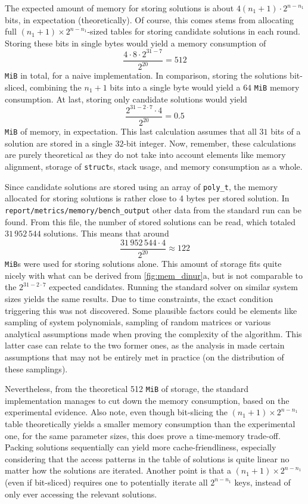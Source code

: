 The expected amount of memory for storing solutions is about $4(n_1 + 1) \cdot 2^{n - n_1}$ bits, in expectation (theoretically). Of course, this comes stems from allocating full $(n_1 + 1) \times 2^{n - n_1}$-sized tables for storing candidate solutions in each round. Storing these bits in single bytes would yield a memory consumption of 
$$
    \frac{4 \cdot 8 \cdot 2^{31 - 7}}{2^{20}} = 512
$$
\texttt{MiB} in total, for a naive implementation. In comparison, storing the solutions bit-sliced, combining the $n_1 + 1$ bits into a single byte would yield a $64$ \texttt{MiB} memory consumption. At last, storing only candidate solutions would yield
$$
    \frac{2^{31 - 2 \cdot 7} \cdot 4}{2^{20}} = 0.5
$$
\texttt{MiB} of memory, in expectation. This last calculation assumes that all $31$ bits of a solution are stored in a single $32$-bit integer. Now, remember, these calculations are purely theoretical as they do not take into account elements like memory alignment, storage of \texttt{struct}s, stack usage, and memory consumption as a whole.

Since candidate solutions are stored using an array of \texttt{poly\_t}, the memory allocated for storing solutions is rather close to 4 bytes per stored solution. In \texttt{report/metrics/memory/bench\_output} other data from the standard run can be found. From this file, the number of stored solutions can be read, which totaled $31\,952\,544$ solutions. This means that around
$$
    \frac{31\,952\,544 \cdot 4}{2^{20}} \approx 122
$$
\texttt{MiB}s were used for storing solutions alone. This amount of storage fits quite nicely with what can be derived from \cref{fig:mem_dinur}a, but is not comparable to the $2^{31 - 2 \cdot 7}$ expected candidates. Running the standard solver on similar system sizes yields the same results. Due to time constraints, the exact condition triggering this was not discovered. Some plausible factors could be elements like sampling of system polynomials, sampling of random matrices or various analytical assumptions made when proving the complexity of the algorithm. This latter case can relate to the two former ones, as the analysis in \cite{eurocrypt-2021-30841} made certain assumptions that may not be entirely met in practice (on the distribution of these samplings).

Nevertheless, from the theoretical 512 \texttt{MiB} of storage, the standard implementation manages to cut down the memory consumption, based on the experimental evidence. Also note, even though bit-slicing the $(n_1 + 1) \times 2^{n - n_1}$ table theoretically yields a smaller memory consumption than the experimental one, for the same parameter sizes, this does prove a time-memory trade-off. Packing solutions sequentially can yield more cache-friendliness, especially considering that the access patterns in the table of solutions is quite linear no matter how the solutions are iterated. Another point is that a $(n_1 + 1) \times 2^{n - n_1}$ (even if bit-sliced) requires one to potentially iterate all $2^{n - n_1}$ keys, instead of only ever accessing the relevant solutions.

